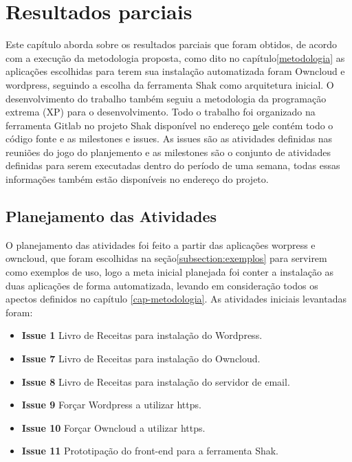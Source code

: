 \chapter{Resultados parciais}
\label{cap-resultados}

Este capítulo aborda sobre os resultados parciais que foram obtidos, de acordo
com a execução da metodologia proposta, como dito no capítulo\ref{metodologia}
as aplicações escolhidas para terem sua instalação automatizada foram Owncloud e
wordpress, seguindo a escolha da ferramenta Shak como arquitetura inicial. O
desenvolvimento do trabalho também seguiu a metodologia da programação extrema
(XP) para o desenvolvimento. Todo o trabalho foi organizado na ferramenta Gitlab
no projeto Shak disponível no endereço \href{https://gitlab.com/shak/shak/} nele
contém todo o código fonte e as milestones e issues. As issues são as atividades
definidas nas reuniões do jogo do planjemento e as milestones são o conjunto de
atividades definidas para serem executadas dentro do período de uma semana, todas
essas informações também estão disponíveis no endereço do projeto.

\section{Planejamento das Atividades}

O planejamento das atividades foi feito a partir das aplicações worpress e owncloud,
que foram escolhidas na seção\ref{subsection:exemplos} para servirem como exemplos
de uso, logo a meta inicial planejada foi conter a instalação as duas aplicações
de forma automatizada, levando em consideração todos os apectos definidos no capítulo
\ref{cap-metodologia}. As atividades iniciais levantadas foram:

 \begin{itemize}
   \item \textbf{Issue 1} Livro de Receitas para instalação do Wordpress.
   \item \textbf{Issue 7} Livro de Receitas para instalação do Owncloud.
   \item \textbf{Issue 8} Livro de Receitas para instalação do servidor de email.
   \item \textbf{Issue 9} Forçar Wordpress a utilizar https.
   \item \textbf{Issue 10} Forçar Owncloud a utilizar https.
   \item \textbf{Issue 11} Prototipação do front-end para a ferramenta Shak.
 \end{itemize}

